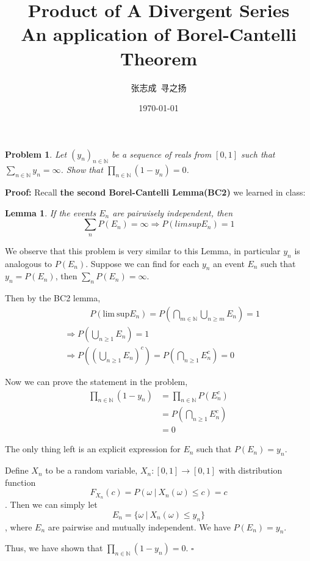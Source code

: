 \documentclass[UTF8, 12pt]{ctexart}
\title{Product of A Divergent Series \\ \large An application of Borel-Cantelli Theorem}
\author{张志成\ 寻之扬}
\date{\today}
\newenvironment{proof}{\noindent\ignorespaces\textbf{Proof:}}{\hfill $\square$\par\noindent}
\newtheorem*{lemma*}{Lemma}
\newtheorem*{problem*}{Problem}
\begin{document}
    \maketitle
    \begin{problem*}
        Let $(y_n)_{n\in\mathbb{N}}$ be a sequence of reals from $[0,1]$ such that $\sum_{n\in\mathbb{N}}y_n = \infty$.
        Show that $\prod_{n\in\mathbb{N}}(1-y_n) = 0$.
    \end{problem*}

    \begin{proof}
        Recall \textbf{the second Borel-Cantelli Lemma(BC2)} we learned in class: 
        \begin{lemma*}
            If the events $E_n$ are pairwisely independent, then $$ \sum_n P(E_n) = \infty \Longrightarrow P(lim sup E_n) = 1 $$
        \end{lemma*} \par
        We observe that this problem is very similar to this Lemma, in particular $y_n$ is analogous to $P(E_n)$. Suppose we can find
        for each $y_n$ an event $E_n$ such that $y_n = P(E_n)$, then $\sum_n P(E_n) = \infty$.
        
        Then by the BC2 lemma, 
        \begin{align*}
            &\quad\quad\quad P(\text{lim}\ \text{sup} E_n) = P(\bigcap_{m\in\mathbb{N}}\bigcup_{n\geq m} E_n) = 1 \\
            &\Longrightarrow P(\bigcup_{n\geq 1} E_n) = 1 \\
            &\Longrightarrow P((\bigcup_{n\geq 1} E_n)^c) = P(\bigcap_{n\geq 1} E_n^c) = 0
        \end{align*}

        Now we can prove the statement in the problem,
        \begin{align*}
            \prod_{n\in\mathbb{N}}(1-y_n) &= \prod_{n\in\mathbb{N}}P(E_n^c)\\
            &= P(\bigcap_{n\geq 1} E_n^c) \\
            &= 0
        \end{align*}

        The only thing left is an explicit expression for $E_n$ such that $P(E_n) = y_n$.
        
        Define $X_n$ to be a random variable, $X_n: [0,1] \to [0,1]$ with distribution function $$ F_{X_n}(c) = P(\omega\ |\ X_n(\omega) \leq c) = c$$.
        Then we can simply let $$ E_n = \{\omega\ |\ X_n(\omega) \leq y_n \} $$, where $E_n$ are pairwise and mutually independent.
        We have $P(E_n) = y_n$.

        Thus, we have shown that $\prod_{n\in\mathbb{N}}(1-y_n) = 0$.
    \end{proof}
\end{document}
